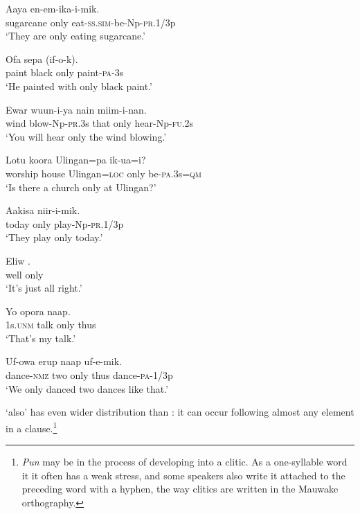 \ea%
\label{ex:x747}
\gll Aaya  en-em-ika-i-mik. \\
sugarcane only eat-\textsc{ss}.\textsc{sim}-be-Np-\textsc{pr}.1/3p\\
\glt`They are only eating sugarcane.' 
\z

\ea%
\label{ex:x748}
\gll Ofa sepa   (if-o-k). \\
paint black only paint-\textsc{pa}-3s\\
\glt`He painted with only black paint.'
\z

\ea%
\label{ex:x757}
\gll Ewar wuun-i-ya nain  miim-i-nan. \\
wind blow-Np-\textsc{pr}.3s that only hear-Np-\textsc{fu}.2s\\
\glt`You will hear only the wind blowing.'
\z

\ea%
\label{ex:x758}
\gll Lotu koora Ulingan=pa  ik-ua=i? \\
worship house Ulingan=\textsc{loc} only be-\textsc{pa}.3s=\textsc{qm}\\
\glt`Is there a church only at Ulingan?'
\z

\ea%
\label{ex:x806}
\gll Aakisa  niir-i-mik. \\
today only play-Np-\textsc{pr}.1/3p\\
\glt`They play only today.'
\z

\ea%
\label{ex:x807}
\gll Eliw . \\
well only\\
\glt`It's just all right.'
\z

\ea%
\label{ex:x1820}
\gll Yo opora  naap. \\
1s.\textsc{unm} talk only thus\\
\glt`That's my talk.'
\z

\ea%
\label{ex:x1821}
\gll Uf-owa erup  naap uf-e-mik. \\
dance-\textsc{nmz} two only thus dance-\textsc{pa}-1/3p\\
\glt`We only danced two dances like that.'
\z

 `also' has even wider distribution than : it can occur following almost any element in a clause.\footnote{\textit{Pun} may be in the process of developing into a clitic. As a one-syllable word it it often has a weak stress, and some speakers also write it attached to the preceding word with a hyphen, the way clitics are written in the Mauwake orthography.} 

